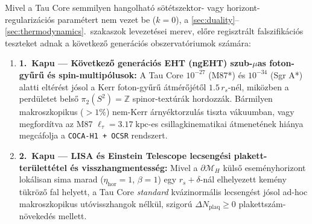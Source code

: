\documentclass[11pt,a4paper]{article}
\theoremstyle{remark}
\begin{document}
Mivel a Tau Core semmilyen hangolhat\'o s\"ot\'etszektor- vagy horizont-regulariz\'aci\'os param\'etert nem vezet be ($k = 0$), a \ref{sec:duality}--\ref{sec:thermodynamics}.\ szakaszok levezet\'esei merev, el\H{o}re regisztr\'alt falszifik\'aci\'os teszteket adnak a k\"ovetkez\H{o} gener\'aci\'os obszervat\'oriumok sz\'am\'ara:
\begin{enumerate}
  \item \textbf{1.\ Kapu --- K\"ovetkez\H{o} gener\'aci\'os EHT (ngEHT) szub-$\mu$as foton-gy\H{u}r\H{u} \'es spin-multip\'olusok:} A Tau Core $10^{-27}$ (M87*) \'es $10^{-34}$ (Sgr A*) alatti elt\'er\'est j\'osol a Kerr foton-gy\H{u}r\H{u} \'atm\'er\H{o}j\'et\H{o}l $1.5\,r_s$-n\'el, mik\"ozben a perd\"uletet bels\H{o} $\pi_2(S^2) = \mathbb{Z}$ spinor-text\'ur\'ak hordozz\'ak. B\'armilyen makroszkopikus ($> 1\%$) nem-Kerr \'arny\'ektorzul\'as tiszta v\'akuumban, vagy megford\'itva az M87 $\ell_\tau = 3.17\;\mathrm{kpc}$-es csillagkinematikai \'atmenet\'enek hi\'anya megc\'afolja a \texttt{COCA-H1 + OCSR} rendszert.
  \item \textbf{2.\ Kapu --- LISA \'es Einstein Telescope lecseng\'esi plakett-ter\"ulett\'etel \'es visszhangmentess\'eg:} Mivel a $\partial\mathcal{M}_H$ k\"uls\H{o} esem\'enyhorizont lok\'alisan sima marad ($\eta_{\mathrm{hor}} = 1$, $\beta = 1$) egy $r_s + \delta$-n\'al elhelyezett kem\'eny t\"ukr\"oz\H{o} fal helyett, a Tau Core \emph{standard} kv\'azinorm\'alis lecseng\'est j\'osol ad-hoc makroszkopikus ut\'ovisszhangok n\'elk\"ul, szigor\'u $\Delta N_{\mathrm{plaq}} \ge 0$ plakettsz\'am-n\"oveked\'es mellett.

\end{enumerate}
\end{document}
